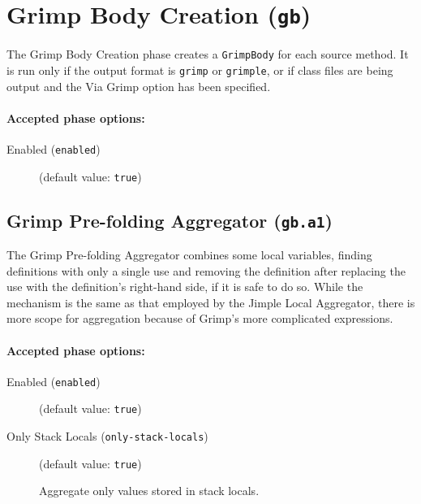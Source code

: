\documentclass{article}
\begin{document}
\section{Grimp Body Creation ({\tt gb})}

The Grimp Body Creation phase creates a {\tt GrimpBody} for
each source method. It is run only if the output format is
{\tt grimp} or {\tt grimple}, or if class files are being
output and the Via Grimp option has been specified.


\paragraph{Accepted phase options:} 

\begin{description}

\item[Enabled ({\tt enabled})]
(default value: {\tt true})






\end{description}

\subsection{Grimp Pre-folding Aggregator ({\tt gb.a1})}

The Grimp Pre-folding Aggregator combines some local variables,
finding definitions with only a single use and removing the
definition after replacing the use with the definition's
right-hand side, if it is safe to do so. While the mechanism is
the same as that employed by the Jimple Local Aggregator, there
is more scope for aggregation because of Grimp's more complicated
expressions.


\paragraph{Accepted phase options:} 

\begin{description}

\item[Enabled ({\tt enabled})]
(default value: {\tt true})






\item[Only Stack Locals ({\tt only-stack-locals})]
(default value: {\tt true})




Aggregate only values stored in stack locals.



\end{description}
\end{document}

